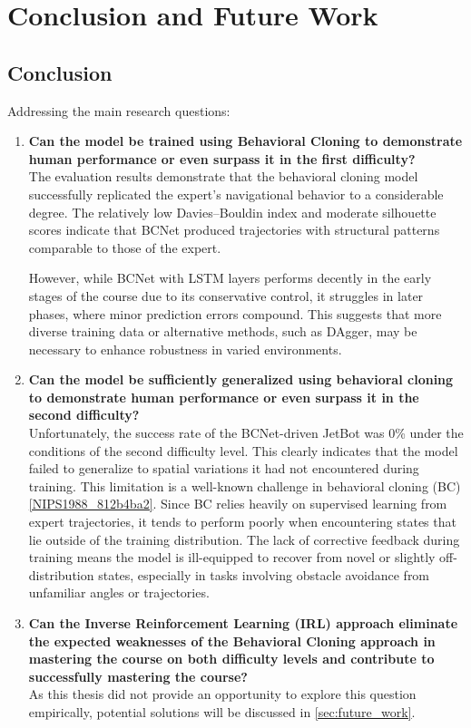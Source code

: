 \chapter{Conclusion and Future Work}
\label{cha:Conclusion}

\section{Conclusion}

Addressing the main research questions:

\begin{enumerate}
  \item \textbf{Can the model be trained using Behavioral Cloning to demonstrate human performance or even surpass it in the first difficulty?} \\
    The evaluation results demonstrate that the behavioral cloning model successfully replicated the expert’s navigational behavior to a considerable degree. The relatively low Davies–Bouldin index and moderate silhouette scores indicate that BCNet produced trajectories with structural patterns comparable to those of the expert.

    However, while BCNet with LSTM layers performs decently in the early stages of the course due to its conservative control, it struggles in later phases, where minor prediction errors compound. This suggests that more diverse training data or alternative methods, such as DAgger, may be necessary to enhance robustness in varied environments.

  \item \textbf{Can the model be sufficiently generalized using behavioral cloning to demonstrate human performance or even surpass it in the second difficulty?} \\
    Unfortunately, the success rate of the BCNet-driven JetBot was 0\% under the conditions of the second difficulty level. This clearly indicates that the model failed to generalize to spatial variations it had not encountered during training. This limitation is a well-known challenge in behavioral cloning (BC) \autoref{NIPS1988_812b4ba2}. Since BC relies heavily on supervised learning from expert trajectories, it tends to perform poorly when encountering states that lie outside of the training distribution. The lack of corrective feedback during training means the model is ill-equipped to recover from novel or slightly off-distribution states, especially in tasks involving obstacle avoidance from unfamiliar angles or trajectories.

  \item \textbf{Can the Inverse Reinforcement Learning (IRL) approach eliminate the expected weaknesses of the Behavioral Cloning approach in mastering the course on both difficulty levels and contribute to successfully mastering the course?} \\
    As this thesis did not provide an opportunity to explore this question empirically, potential solutions will be discussed in \autoref{sec:future_work}.
\end{enumerate}

